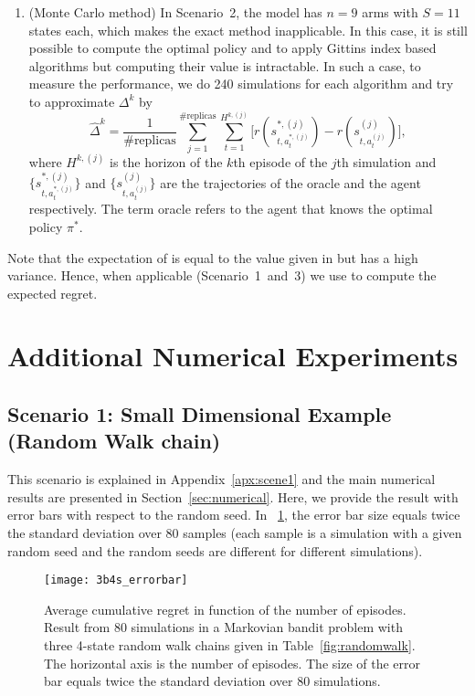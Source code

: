 \begin{subappendices}
\begin{enumerate}
    \item (Monte Carlo method) In Scenario~2, the model has $n=9$ arms with $S=11$ states each, which makes the exact method inapplicable. In this case, it is still possible to compute the optimal policy and to apply Gittins index based algorithms but computing their value is intractable. In such a case, to measure the performance, we do 240 simulations for each algorithm and try to approximate $\Delta^k$ by
    \begin{equation}
        \label{eq:simulation_value}
        \hat{\Delta}^k=\frac1{\text{\#replicas}}\sum_{j=1}^{\text{\#replicas}}\sum_{t=1}^{H^{k,(j)}}\Big[r(s_{t,a^{*,(j)}_t}^{*,(j)}) -r(s_{t,a^{(j)}_t}^{(j)})\Big],
    \end{equation}
    where $H^{k,(j)}$ is the horizon of the $k$th episode of the $j$th simulation and $\{s_{t,a^{*,(j)}_t}^{*,(j)}\}$ and $\{s_{t,a^{(j)}_t}^{(j)}\}$ are the trajectories of the oracle and the agent respectively. The term oracle refers to the agent that knows the optimal policy $\pi^*$.
\end{enumerate}
Note that the expectation of  is equal to the value given in  but  has a high variance. Hence, when applicable (Scenario~1~and~3) we use  to compute the expected regret.

\section{Additional Numerical Experiments}
\label{apx:add_numerical}

\subsection{Scenario 1: Small Dimensional Example (Random Walk chain)}
\label{sssec:random_walk}

This scenario is explained in Appendix~\ref{apx:scene1} and the main numerical results are presented in Section~\ref{sec:numerical}. Here, we provide the result with error bars with respect to the random seed. In \figurename~\ref{fig:randomwalk_3b4s_errorbar}, the error bar size equals twice the standard deviation over 80 samples (each sample is a simulation with a given random seed and the random seeds are different for different simulations).

\begin{figure}[ht]
    \center
    \texttt{[image: 3b4s\_errorbar]}
    \caption{Average cumulative regret in function of the number of episodes. Result from 80 simulations in a Markovian bandit problem with three 4-state random walk chains given in Table~\ref{fig:randomwalk}. The horizontal axis is the number of episodes. The size of the error bar equals twice the standard deviation over 80 simulations.}
    \label{fig:randomwalk_3b4s_errorbar}
\end{figure}


\end{subappendices}
